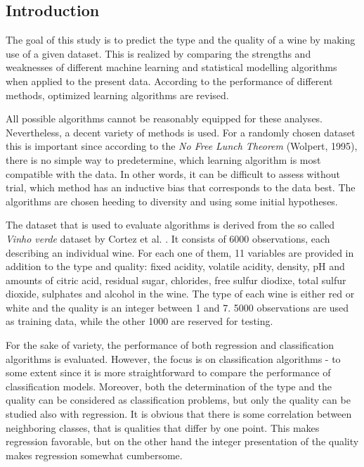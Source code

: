 \documentclass[twoside]{article}
\begin{document}
\begin{multicols}{2} %

\section{Introduction}

The goal of this study is to predict the type and the quality of a wine by making use of a given dataset.
This is realized by comparing the strengths and weaknesses of different machine learning 
and statistical modelling algorithms when applied to the present data. According to the performance of 
different methods, optimized learning algorithms are revised.
 
All possible algorithms cannot be reasonably equipped for these analyses. Nevertheless,
a decent variety of methods is used. For a randomly chosen dataset this is important since according to
the \emph{No Free Lunch Theorem} (Wolpert, 1995), there is no simple way to predetermine, which
learning algorithm is most compatible with the data. In other words, it can be difficult to assess
without trial, which method has an inductive bias that corresponds to the data best.
The algorithms are chosen heeding to diversity and using some initial hypotheses. 

The dataset that is used to evaluate algorithms is derived from the so called \emph{Vinho verde} dataset by Cortez et al. \cite{CorCer09}.
It consists of 6000 observations, each describing an individual wine. For each one of them, 11 variables are provided in addition
to the type and quality: fixed acidity, volatile acidity, density, pH and amounts of citric acid, residual sugar, chlorides, 
free sulfur diodixe, total sulfur dioxide, sulphates and alcohol in the wine. The type of each wine is either red or white 
and the quality is an integer between 1 and 7. 5000 observations are used as training data, while the other 1000 are reserved for testing.
 
For the sake of variety, the performance of both regression and classification algorithms is evaluated.
However, the focus is on classification algorithms - to some extent since it is more straightforward to compare the 
performance of classification models. Moreover, both the determination of the type and the quality can be considered
as classification problems, but only the quality can be studied also with regression. It is obvious that
there is some correlation between neighboring classes, that is qualities that differ by one point. This makes
regression favorable, but on the other hand the integer presentation of the quality makes regression somewhat cumbersome.


\end{multicols}
\end{document}
